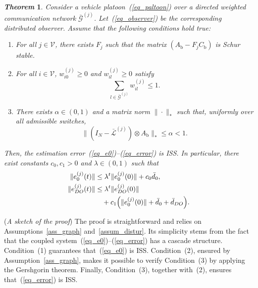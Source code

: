 \documentclass{ifacconf}
\def\eqref#1{(\ref{#1})}
\def\V{\mathcal{V}} %
\def\G{\mathcal{G}} %
\def\L{\mathcal{L}} %
\newtheorem{theorem}{\it \textbf{Theorem}}%
\begin{document}
\begin{theorem}\label{thm_observer}
Consider a vehicle platoon~\eqref{eq_paltoon} over a directed weighted communication network $\bar{\G}^{(j)}$. Let~\eqref{eq_observer} be the corresponding distributed observer. Assume that the following conditions hold true:
\begin{enumerate}
    \item For all $j \in \V$, there exists $F_{j}$ such that the matrix $\left( A_{\text{b}} - F_{j}C_{\text{b}} \right)$ is {\it Schur} stable.
    \item For all $i \in \V$, $w_{i0}^{(j)} \geq 0$ and $w_{il}^{(j)} \geq 0$ satisfy 
    \begin{equation}\label{thm_W}%
    \sum_{l\in \bar{\G}^{(j)}} w_{il}^{(j)} \leq 1.
    \end{equation}
    \item There exists $\alpha \in (0,1)$ and a matrix norm $\| \cdot \|_*$ such that, uniformly over all admissible switches,
	\begin{equation} \label{assume3}
        \| \left( I_{N} - \bar{\L}^{(j)} \right)  \otimes  A_{\text{b}} \|_* \leq \alpha < 1.
	\end{equation}
\end{enumerate}
Then, the estimation error~\eqref{eq_e0}--\eqref{eq_error} is ISS. In particular, there exist constants $c_0, c_1 > 0$ and $\lambda \in (0,1)$ such that
%
\begin{align}
\|e_0^{(j)}(t)\| &\le \lambda^t \|e_0^{(j)}(0)\| + c_0 \bar{d}_0,\\
\|e_{DO}^{(j)}(t)\| &\le \lambda^t \|e_{DO}^{(j)}(0)\| \notag\\
&\quad+ c_1 \Big(\|e_0^{(j)}(0)\| + \bar{d}_0 + \bar{d}_{DO}\Big).
\end{align}

\end{theorem}

\begin{pf}({\it A sketch of the proof})
The proof is straightforward and relies on Assumptions~\ref{ass_graph} and~\ref{assum_distur}. Its simplicity stems from the fact that the coupled system~\eqref{eq_e0}--\eqref{eq_error} has a cascade structure. Condition~(1) guarantees that~\eqref{eq_e0} is ISS. Condition~(2), ensured by Assumption~\ref{ass_graph}, makes it possible to verify Condition~(3) by applying the Gershgorin theorem. Finally, Condition~(3), together with~(2), ensures that~\eqref{eq_error} is ISS.
\end{pf}
\end{document}
